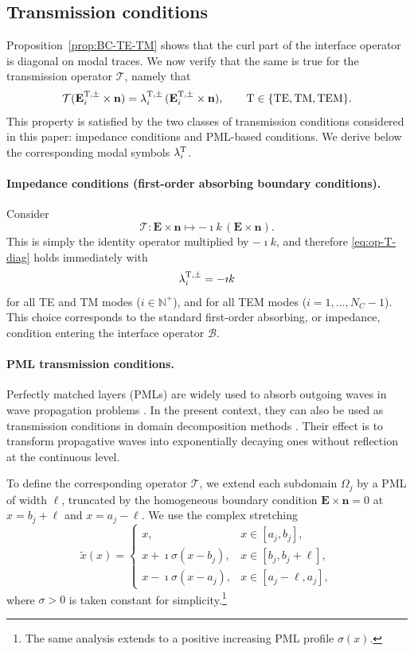 \documentclass[smallextended]{svjour3}       %
\begin{document}
\subsection{Transmission conditions}
\label{subsec:TC}

Proposition~\ref{prop:BC-TE-TM} shows that the curl part of the interface operator is diagonal on modal traces. We now verify that the same is true for the transmission operator $\mathcal T$, namely that
\begin{equation}\label{eq:op-T-diag}
\mathcal T(\mathbf E_i^{{\rm T},\pm}\times \mathbf n)
=
\lambda_i^{{\rm T},\pm}\,(\mathbf E_i^{{\rm T},\pm}\times \mathbf n),
\qquad
{\rm T}\in\{{\rm TE,TM,TEM}\}.
\end{equation}
This property is satisfied by the two classes of transmission conditions considered in this paper: impedance conditions and PML-based conditions. We derive below the corresponding modal symbols $\lambda_i^{\rm T}$.

\paragraph{Impedance conditions (first-order absorbing boundary conditions).}
Consider
\begin{equation}\label{def:op-T-ik}
\mathcal T : \mathbf E\times \mathbf n \longmapsto -\imath k\,(\mathbf E\times \mathbf n).
\end{equation}
This is simply the identity operator multiplied by $-\imath k$, and therefore \eqref{eq:op-T-diag} holds immediately with
\[
\lambda_i^{{\rm T},\pm}=-\imath k
\]
for all TE and TM modes ($i\in\mathbb N^+$), and for all TEM modes ($i=1,\dots,N_C-1$). This choice corresponds to the standard first-order absorbing, or impedance, condition entering the interface operator $\mathcal B$.

\paragraph{PML transmission conditions.}
Perfectly matched layers (PMLs) are widely used to absorb outgoing waves in wave propagation problems \cite{bramble2007analysis}. In the present context, they can also be used as transmission conditions in domain decomposition methods \cite{Bootland:2022:NAP,royer2022non}. Their effect is to transform propagative waves into exponentially decaying ones without reflection at the continuous level.

To define the corresponding operator $\mathcal T$, we extend each subdomain $\Omega_j$ by a PML of width $\ell$, truncated by the homogeneous boundary condition
\(\mathbf E\times \mathbf n = 0 \) {at} \(x=b_j+\ell\)  and \(x=a_j-\ell.\)
We use the complex stretching
\[
\widetilde x(x)=
\begin{cases}
x, & x\in[a_j,b_j],\\
x+\imath\sigma(x-b_j), & x\in[b_j,b_j+\ell],\\
x-\imath\sigma(x-a_j), & x\in[a_j-\ell,a_j],
\end{cases}
\]
where $\sigma>0$ is taken constant for simplicity.\footnote{The same analysis extends to a positive increasing PML profile $\sigma(x)$.}
\end{document}
